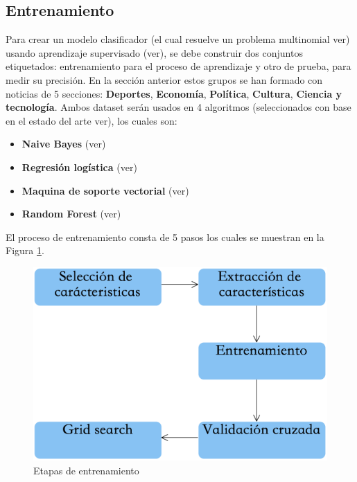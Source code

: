 


\subsection{Entrenamiento}

Para crear un modelo clasificador (el cual resuelve un problema multinomial ver) usando aprendizaje supervisado (ver), se debe construir dos conjuntos etiquetados: entrenamiento para el proceso de aprendizaje y otro de prueba, para medir su precisión. En la sección anterior estos grupos se han formado con noticias de 5 secciones: \textbf{Deportes}, \textbf{Economía}, \textbf{Política}, \textbf{Cultura}, \textbf{Ciencia y tecnología}. Ambos dataset serán usados en 4 algoritmos (seleccionados con base en el estado del arte ver), los cuales son:

\begin{itemize}
	\item \textbf{Naive Bayes} (ver)
	\item \textbf{Regresión logística} (ver)
	\item \textbf{Maquina de soporte vectorial} (ver)
	\item \textbf{Random Forest} (ver)
\end{itemize}

El proceso de entrenamiento consta de 5 pasos los cuales se muestran en la Figura \ref{fig:cp5:entrenamiento}.

\begin{figure}[h]
\centering
\includegraphics[scale=.5]{imagenes/capitulo5/Entrenamiento.png}
\caption{Etapas de entrenamiento}
\label{fig:cp5:entrenamiento}
\end{figure}

